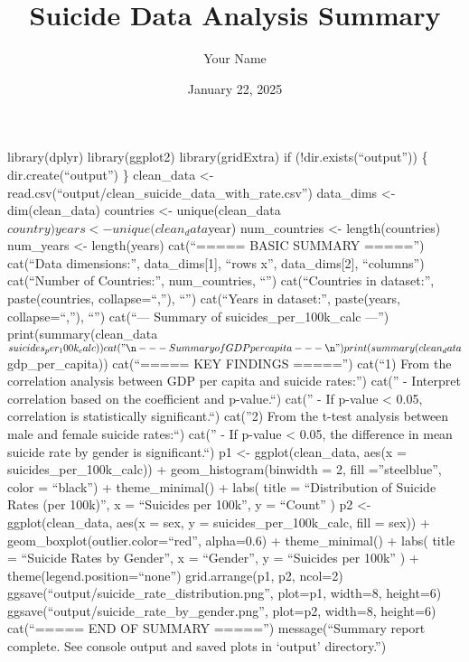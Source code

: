 \documentclass[
]{article}
\title{Suicide Data Analysis Summary}
\author{Your Name}
\date{January 22, 2025}
\begin{document}
\maketitle

library(dplyr) library(ggplot2) library(gridExtra) if
(!dir.exists(``output'')) \{ dir.create(``output'') \} clean\_data
\textless- read.csv(``output/clean\_suicide\_data\_with\_rate.csv'')
data\_dims \textless- dim(clean\_data) countries \textless-
unique(clean\_data\(country)
years <- unique(clean_data\)year) num\_countries \textless-
length(countries) num\_years \textless- length(years) cat(``===== BASIC
SUMMARY =====\n'') cat(``Data dimensions:'', data\_dims{[}1{]}, ``rows
x'', data\_dims{[}2{]}, ``columns\n'') cat(``Number of Countries:'',
num\_countries, ``\n'') cat(``Countries in dataset:'', paste(countries,
collapse=``,''), ``\n'') cat(``Years in dataset:'', paste(years,
collapse=``,''), ``\n'') cat(``\n--- Summary of
suicides\_per\_100k\_calc ---\n'')
print(summary(clean\_data\(suicides_per_100k_calc))
cat("\n--- Summary of GDP per capita ---\n")
print(summary(clean_data\)gdp\_per\_capita)) cat(``\n===== KEY FINDINGS
=====\n'') cat(``1) From the correlation analysis between GDP per capita
and suicide rates:\n'') cat('' - Interpret correlation based on the
coefficient and p-value.\n``) cat('' - If p-value \textless{} 0.05,
correlation is statistically significant.\n\n``) cat(''2) From the
t-test analysis between male and female suicide rates:\n``) cat('' - If
p-value \textless{} 0.05, the difference in mean suicide rate by gender
is significant.\n``) p1 \textless- ggplot(clean\_data, aes(x =
suicides\_per\_100k\_calc)) + geom\_histogram(binwidth = 2, fill
=''steelblue'', color = ``black'') + theme\_minimal() + labs( title =
``Distribution of Suicide Rates (per 100k)'', x = ``Suicides per 100k'',
y = ``Count'' ) p2 \textless- ggplot(clean\_data, aes(x = sex, y =
suicides\_per\_100k\_calc, fill = sex)) +
geom\_boxplot(outlier.color=``red'', alpha=0.6) + theme\_minimal() +
labs( title = ``Suicide Rates by Gender'', x = ``Gender'', y =
``Suicides per 100k'' ) + theme(legend.position=``none'')
grid.arrange(p1, p2, ncol=2)
ggsave(``output/suicide\_rate\_distribution.png'', plot=p1, width=8,
height=6) ggsave(``output/suicide\_rate\_by\_gender.png'', plot=p2,
width=8, height=6) cat(``\n===== END OF SUMMARY =====\n'')
message(``Summary report complete. See console output and saved plots in
`output' directory.'')
\end{document}
